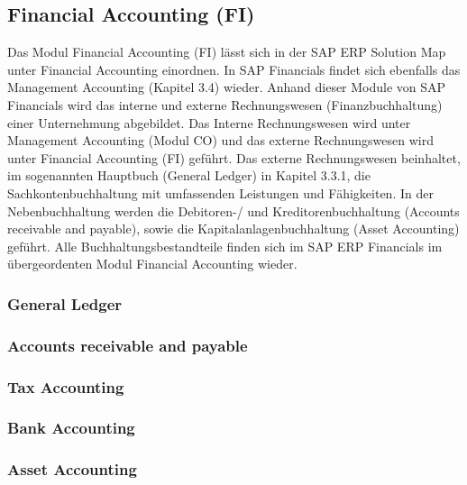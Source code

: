 \subsection{Financial Accounting (FI)} %
Das Modul Financial Accounting (FI) lässt sich in der SAP ERP Solution Map unter Financial Accounting einordnen. 
In SAP Financials findet sich ebenfalls das Management Accounting (Kapitel 3.4) wieder. Anhand dieser Module von SAP Financials wird das interne und externe Rechnungswesen (Finanzbuchhaltung) einer Unternehmung abgebildet. Das Interne Rechnungswesen wird unter Management Accounting (Modul CO) und das externe Rechnungswesen wird unter Financial Accounting (FI) geführt. Das externe Rechnungswesen beinhaltet, im sogenannten Hauptbuch (General Ledger) in Kapitel 3.3.1, die Sachkontenbuchhaltung mit umfassenden Leistungen und Fähigkeiten. In der Nebenbuchhaltung werden die Debitoren-/ und Kreditorenbuchhaltung (Accounts receivable and payable), sowie die Kapitalanlagenbuchhaltung (Asset Accounting) geführt. Alle Buchhaltungsbestandteile finden sich im SAP ERP Financials im übergeordenten Modul Financial Accounting wieder.

\subsubsection{General Ledger} %
\subsubsection{Accounts receivable and payable} %
\subsubsection{Tax Accounting} %

\subsubsection{Bank Accounting} %
\subsubsection{Asset Accounting} %

